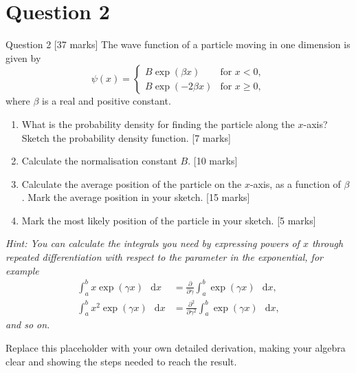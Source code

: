 \documentclass[12pt]{article}
\newif\ifsolutions
\renewcommand{\d}{\mathop{}\!\mathrm{d}}
\begin{document}
\section{Question 2}
\begin{problembox}{Question 2 \hfill [37 marks]}
The wave function of a particle moving in one dimension is given by
\[
    \psi(x) = \begin{cases}
        B \exp(\beta x) & \text{for } x<0,\\
        B \exp(-2\beta x) & \text{for } x \ge 0,
    \end{cases}
\]
where \(\beta\) is a real and positive constant.

\begin{enumerate}
    \item What is the probability density for finding the particle along the \(x\)-axis? Sketch the probability density function. \hfill [7 marks]
    \item Calculate the normalisation constant \(B\). \hfill [10 marks]
    \item Calculate the average position of the particle on the \(x\)-axis, as a function of \(\beta\). Mark the average position in your sketch. \hfill [15 marks]
    \item Mark the most likely position of the particle in your sketch. \hfill [5 marks]
\end{enumerate}

\textit{Hint: You can calculate the integrals you need by expressing powers of \(x\) through repeated differentiation with respect to the parameter in the exponential, for example}
\begin{align*}
    \int_a^b x \exp(\gamma x)\,\d x
    &= \frac{\partial}{\partial \gamma} \int_a^b \exp(\gamma x)\,\d x, \\
    \int_a^b x^2 \exp(\gamma x)\,\d x
    &= \frac{\partial^2}{\partial \gamma^2} \int_a^b \exp(\gamma x)\,\d x,
\end{align*}
\textit{and so on.}
\end{problembox}

\ifsolutions
\begin{solutionbox}
 Replace this placeholder with your own detailed derivation, making your algebra clear and showing the steps needed to reach the result.
\end{solutionbox}
\end{document}
